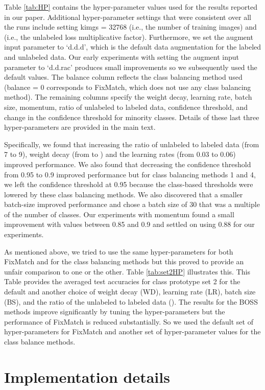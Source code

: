 \documentclass[final]{cvpr}
\newcommand{\HP}{hyper-parameter }
\newcommand{\HPs}{hyper-parameters }
\begin{document}
Table \ref{tab:HP} contains the hyper-parameter values used for the results reported in our paper.
Additional hyper-parameter settings that were consistent over all the runs include setting kimgs = 32768 (i.e., the number of training images) and  (i.e., the unlabeled loss multiplicative factor).
Furthermore, we set the augment input parameter to `d.d.d', which is the default data augmentation for the labeled and unlabeled data.
Our early experiments with setting the augment input parameter to `d.d.rac' produces small improvements so we subsequently used the default values.
The balance column reflects the class balancing method used (balance = 0 corresponds to FixMatch, which does not use any class balancing method).
The remaining columns specify the weight decay, learning rate, batch size, momentum, ratio of unlabeled to labeled data, confidence threshold, and change in the confidence threshold for minority classes.
Details of these last three hyper-parameters are provided in the main text.

Specifically, we found that increasing the ratio of unlabeled to labeled data (from 7 to 9), weight decay (from  to )  and the learning rates (from 0.03 to 0.06) improved performance.
We also found that decreasing the confidence threshold from 0.95 to 0.9 improved performance but for class balancing methods 1 and 4, we left the confidence threshold at 0.95 because the class-based thresholds were lowered by these class balancing methods.
We also discovered that a smaller batch-size improved performance and chose a batch size of 30 that was a multiple of the number of classes. 
Our experiments with momentum found a small improvement with values between 0.85 and 0.9 and settled on using 0.88 for our experiments.

As mentioned above, we tried to use the same \HPs for both FixMatch and for the class balancing methods but this proved to provide an unfair comparison to one or the other.
Table \ref{tab:set2HP} illustrates this.
This Table provides the averaged test accuracies for class prototype set 2 for the default and another choice of weight decay (WD), learning rate (LR), batch size (BS), and the ratio of the unlabeled to labeled data ().
The results for the BOSS methods improve significantly by tuning the \HPs but the performance of FixMatch is reduced substantially.
So we used the default set of \HPs for FixMatch and another set of \HP values for the class balance methods.

\section{Implementation details}
\label{sec:Implementation}
\end{document}
